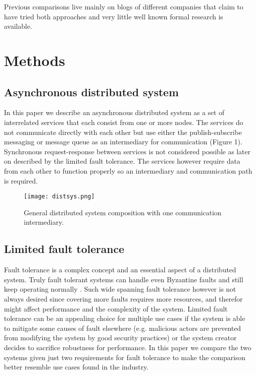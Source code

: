 \documentclass[conference]{IEEEtran}
\begin{document}
\indent Previous comparisons live mainly on blogs of different companies that claim to have tried both approaches and very little well known formal research is available.

\section{Methods}

\subsection{Asynchronous distributed system}
In this paper we describe an asynchronous distributed system as a set of interrelated services that each consist from one or more nodes. The services do not communicate directly with each other but use either the publish-subscribe messaging or message queue as an intermediary for communication (Figure 1). Synchronous request-response between services is not considered possible as later on described by the limited fault tolerance. The services however require data from each other to function properly so an intermediary and communication path is required.

\begin{figure}[h]
    \centering
    \texttt{[image: distsys.png]}
    \caption{General distributed system composition with one communication intermediary.}
\end{figure}

\subsection{Limited fault tolerance}
Fault tolerance is a complex concept and an essential aspect of a distributed system. Truly fault tolerant systems can handle even Byzantine faults and still keep operating normally \cite{pracbyzfaultol}. Such wide spanning fault tolerance however is not always desired since covering more faults requires more resources, and therefor might affect performance and the complexity of the system. Limited fault tolerance can be an appealing choice for multiple use cases if the system is able to mitigate some causes of fault elsewhere (e.g. malicious actors are prevented from modifying the system by good security practices) or the system creator decides to sacrifice robustness for performance. In this paper we compare the two systems given just two requirements for fault tolerance to make the comparison better resemble use cases found in the industry.
\end{document}
